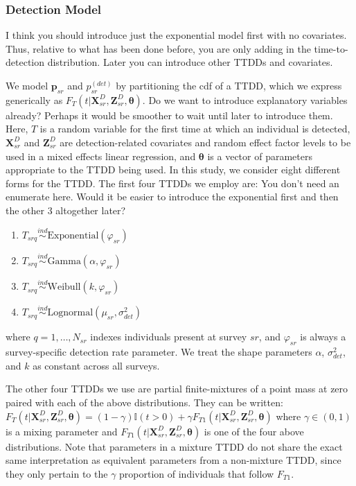 \documentclass[useAMS,usenatbib,referee,12pt]{article}
\newcommand{\jarad}[1]{{\color{red} #1}}
\begin{document}
\subsubsection{Detection Model}\label{sec:detectionmodel}

\jarad{I think you should introduce just the exponential model first with no covariates. Thus, relative to what has been done before, you are only adding in the time-to-detection distribution. Later you can introduce other TTDDs and covariates.}

We model $\textbf{p}_{sr}$ and $p_{sr}^{(det)}$ by partitioning the cdf of a TTDD, which we express generically as $F_T(t|\textbf{X}_{sr}^D, \textbf{Z}_{sr}^D, \boldsymbol{\theta})$. 
\jarad{Do we want to introduce explanatory variables already? Perhaps it would be smoother to wait until later to introduce them.}
Here, $T$ is a random variable for the first time at which an individual is detected, $\textbf{X}_{sr}^D$ and $\textbf{Z}_{sr}^D$ are detection-related covariates and random effect factor levels to be used in a mixed effects linear regression, and $\boldsymbol{\theta}$ is a vector of parameters appropriate to the TTDD being used.  In this study, we consider eight different forms for the TTDD.  The first four TTDDs we employ are:
\jarad{You don't need an enumerate here. Would it be easier to introduce the exponential first and then the other 3 altogether later?}
\begin{enumerate}
\item $T_{srq} \overset{ind}{\sim} \text{Exponential}(\varphi_{sr})$
\item $T_{srq} \overset{ind}{\sim} \text{Gamma}(\alpha, \varphi_{sr})$
\item $T_{srq} \overset{ind}{\sim} \text{Weibull}(k, \varphi_{sr})$
\item $T_{srq} \overset{ind}{\sim} \text{Lognormal}(\mu_{sr}, \sigma_{det}^2)$
\end{enumerate}
where $q = 1,\dotso,N_{sr}$ indexes individuals present at survey $sr$, and $\varphi_{sr}$ is always a survey-specific detection rate parameter.  We treat the shape parameters $\alpha$, $\sigma_{det}^2$, and $k$ as constant across all surveys.

The other four TTDDs we use are partial finite-mixtures of a point mass at zero paired with each of the above distributions.  They can be written: $F_T(t|\textbf{X}_{sr}^D, \textbf{Z}_{sr}^D, \boldsymbol{\theta}) = (1-\gamma)\mathbb{I}(t>0) + \gamma F_{T1}(t|\textbf{X}_{sr}^D, \textbf{Z}_{sr}^D, \boldsymbol{\theta})$ where $\gamma \in (0,1)$ is a mixing parameter and $F_{T1}(t|\textbf{X}_{sr}^D, \textbf{Z}_{sr}^D, \boldsymbol{\theta})$ is one of the four above distributions.  Note that parameters in a mixture TTDD do not share the exact same interpretation as equivalent parameters from a non-mixture TTDD, since they only pertain to the $\gamma$ proportion of individuals that follow $F_{T1}$.
\end{document}
